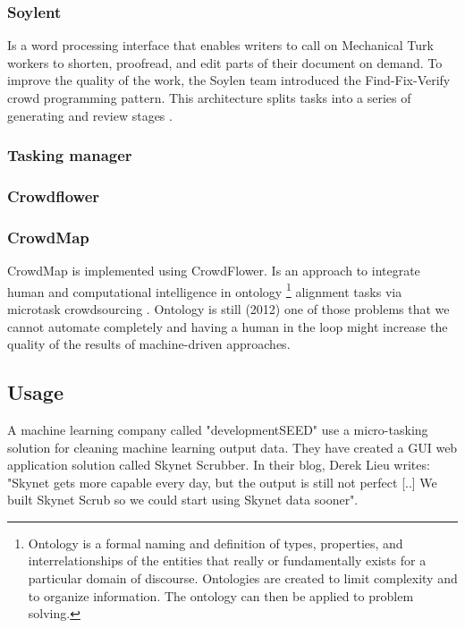 \subsubsection{Soylent}\label{sec:soylent}
Is a word processing interface that enables writers to call on Mechanical Turk workers to shorten, proofread, and edit parts of their document on demand. To improve the quality of the work, the Soylen team introduced the Find-Fix-Verify crowd programming pattern. This architecture splits tasks into a series of generating and review stages \citep{Bernstein2015a}. 

\subsubsection{Tasking manager}
\subsubsection{Crowdflower}
\subsubsection{CrowdMap}

CrowdMap is implemented using CrowdFlower. 
Is an approach to integrate human and computational intelligence in ontology \footnote{\label{ontology} Ontology is a formal naming and definition of types, properties, and interrelationships of the entities that really or fundamentally exists for a particular domain of discourse. Ontologies are created to limit complexity and to organize information. The ontology can then be applied to problem solving. } alignment tasks via microtask crowdsourcing \citep{Sarasua2012}. Ontology is still (2012) one of those problems that we cannot automate completely and having a human in the loop might increase the quality of the results of machine-driven approaches. 





\subsection{Usage}
A machine learning company called "developmentSEED" use a micro-tasking solution for cleaning machine learning output data. They have created a GUI web application solution called Skynet Scrubber. In their blog, Derek Lieu writes: "Skynet gets more capable every day, but the output is still not perfect [..] We built Skynet Scrub so we could start using Skynet data sooner". 

